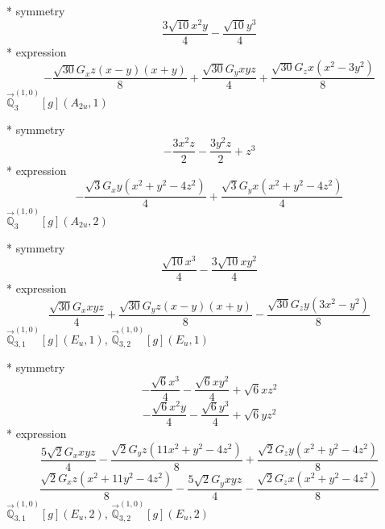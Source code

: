 \documentclass[fleqn,8pt]{jsarticle}
\begin{document}
\noindent\quad ** symmetry
\begin{dmath*}
\frac{3 \sqrt{10} x^{2} y}{4} - \frac{\sqrt{10} y^{3}}{4}
\end{dmath*}
\noindent\quad ** expression
\begin{dmath*}
- \frac{\sqrt{30} G_{x} z \left(x - y\right) \left(x + y\right)}{8} + \frac{\sqrt{30} G_{y} x y z}{4} + \frac{\sqrt{30} G_{z} x \left(x^{2} - 3 y^{2}\right)}{8}
\end{dmath*}
\noindent\quad $\vec{\mathbb{Q}}_{3}^{(1,0)}[g](A_{2u},1)$

\noindent\quad ** symmetry
\begin{dmath*}
- \frac{3 x^{2} z}{2} - \frac{3 y^{2} z}{2} + z^{3}
\end{dmath*}
\noindent\quad ** expression
\begin{dmath*}
- \frac{\sqrt{3} G_{x} y \left(x^{2} + y^{2} - 4 z^{2}\right)}{4} + \frac{\sqrt{3} G_{y} x \left(x^{2} + y^{2} - 4 z^{2}\right)}{4}
\end{dmath*}
\noindent\quad $\vec{\mathbb{Q}}_{3}^{(1,0)}[g](A_{2u},2)$

\noindent\quad ** symmetry
\begin{dmath*}
\frac{\sqrt{10} x^{3}}{4} - \frac{3 \sqrt{10} x y^{2}}{4}
\end{dmath*}
\noindent\quad ** expression
\begin{dmath*}
\frac{\sqrt{30} G_{x} x y z}{4} + \frac{\sqrt{30} G_{y} z \left(x - y\right) \left(x + y\right)}{8} - \frac{\sqrt{30} G_{z} y \left(3 x^{2} - y^{2}\right)}{8}
\end{dmath*}
\noindent\quad $\vec{\mathbb{Q}}_{3,1}^{(1,0)}[g](E_{u},1)$, $\vec{\mathbb{Q}}_{3,2}^{(1,0)}[g](E_{u},1)$

\noindent\quad ** symmetry
\begin{dmath*}
- \frac{\sqrt{6} x^{3}}{4} - \frac{\sqrt{6} x y^{2}}{4} + \sqrt{6} x z^{2}
\end{dmath*}
\begin{dmath*}
- \frac{\sqrt{6} x^{2} y}{4} - \frac{\sqrt{6} y^{3}}{4} + \sqrt{6} y z^{2}
\end{dmath*}
\noindent\quad ** expression
\begin{dmath*}
\frac{5 \sqrt{2} G_{x} x y z}{4} - \frac{\sqrt{2} G_{y} z \left(11 x^{2} + y^{2} - 4 z^{2}\right)}{8} + \frac{\sqrt{2} G_{z} y \left(x^{2} + y^{2} - 4 z^{2}\right)}{8}
\end{dmath*}
\begin{dmath*}
\frac{\sqrt{2} G_{x} z \left(x^{2} + 11 y^{2} - 4 z^{2}\right)}{8} - \frac{5 \sqrt{2} G_{y} x y z}{4} - \frac{\sqrt{2} G_{z} x \left(x^{2} + y^{2} - 4 z^{2}\right)}{8}
\end{dmath*}
\noindent\quad $\vec{\mathbb{Q}}_{3,1}^{(1,0)}[g](E_{u},2)$, $\vec{\mathbb{Q}}_{3,2}^{(1,0)}[g](E_{u},2)$
\end{document}
